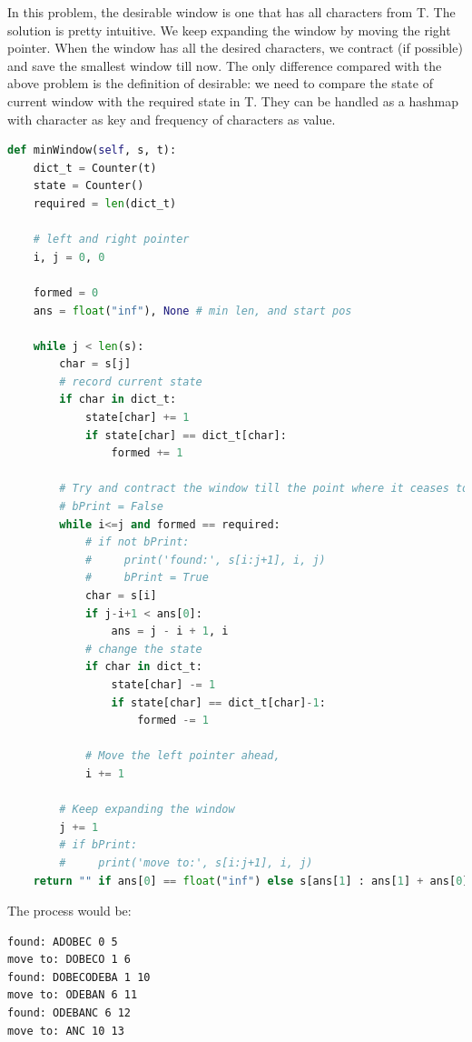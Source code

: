 \documentclass[../searching.tex]{subfiles}
\begin{document}
In this problem, the desirable window is one that has all characters from T. The solution is pretty intuitive. We keep expanding the window by moving the right pointer. When the window has all the desired characters, we contract (if possible) and save the smallest window till now. The only difference compared with the above problem is the definition of desirable: we need to compare the state of current window with the required state in T. They can be handled as a hashmap with character as key and frequency of characters as value. 
\begin{lstlisting}[language=Python]
def minWindow(self, s, t):
    dict_t = Counter(t)
    state = Counter()
    required = len(dict_t)

    # left and right pointer
    i, j = 0, 0

    formed = 0
    ans = float("inf"), None # min len, and start pos

    while j < len(s):
        char = s[j]
        # record current state
        if char in dict_t:
            state[char] += 1
            if state[char] == dict_t[char]:
                formed += 1

        # Try and contract the window till the point where it ceases to be 'desirable'.
        # bPrint = False
        while i<=j and formed == required:
            # if not bPrint:
            #     print('found:', s[i:j+1], i, j)
            #     bPrint = True
            char = s[i]
            if j-i+1 < ans[0]:
                ans = j - i + 1, i
            # change the state
            if char in dict_t:
                state[char] -= 1
                if state[char] == dict_t[char]-1:
                    formed -= 1

            # Move the left pointer ahead,
            i += 1    
        
        # Keep expanding the window 
        j += 1  
        # if bPrint:
        #     print('move to:', s[i:j+1], i, j)
    return "" if ans[0] == float("inf") else s[ans[1] : ans[1] + ans[0]]
\end{lstlisting}

The process would be:
\begin{lstlisting}[numbers=none]
found: ADOBEC 0 5
move to: DOBECO 1 6
found: DOBECODEBA 1 10
move to: ODEBAN 6 11
found: ODEBANC 6 12
move to: ANC 10 13
\end{lstlisting}
\end{document}
